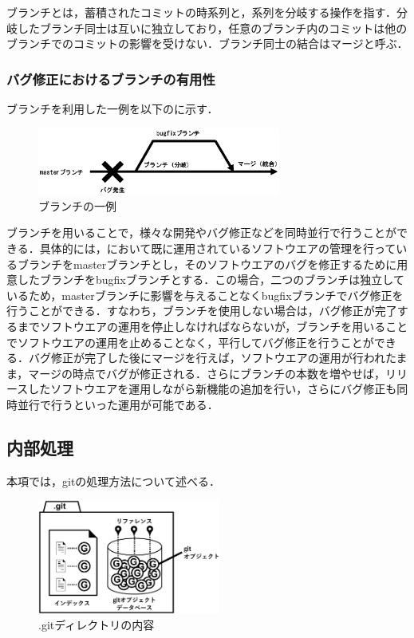 \documentclass[a4paper,9pt,twocolumn]{jsarticle}
\begin{document}
ブランチとは，蓄積されたコミットの時系列と，系列を分岐する操作を指す．分岐したブランチ同士は互いに独立しており，任意のブランチ内のコミットは他のブランチでのコミットの影響を受けない．ブランチ同士の結合はマージと呼ぶ．

\subsubsection{バグ修正におけるブランチの有用性}
ブランチを利用した一例を以下のに示す．

\begin{figure}[h]
\centering
\includegraphics[width=80mm]{img/branch.eps}
\caption{ブランチの一例}
\label{branch_ex}
\end{figure}

ブランチを用いることで，様々な開発やバグ修正などを同時並行で行うことができる．具体的には，において既に運用されているソフトウエアの管理を行っているブランチをmasterブランチとし，そのソフトウエアのバグを修正するために用意したブランチをbugfixブランチとする．この場合，二つのブランチは独立しているため，masterブランチに影響を与えることなくbugfixブランチでバグ修正を行うことができる．すなわち，ブランチを使用しない場合は，バグ修正が完了するまでソフトウエアの運用を停止しなければならないが，ブランチを用いることでソフトウエアの運用を止めることなく，平行してバグ修正を行うことができる．バグ修正が完了した後にマージを行えば，ソフトウエアの運用が行われたまま，マージの時点でバグが修正される．さらにブランチの本数を増やせば，リリースしたソフトウエアを運用しながら新機能の追加を行い，さらにバグ修正も同時並行で行うといった運用が可能である．

\subsection{内部処理}
本項では，gitの処理方法について述べる．

\begin{figure}[h]
\centering
\includegraphics[width=60mm]{img/git_obj.eps}
\caption{.gitディレクトリの内容}
\label{object}
\end{figure}
\end{document}
